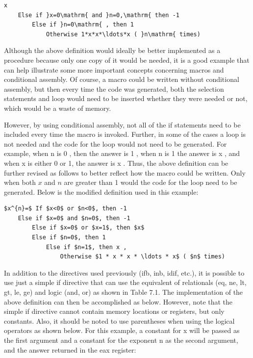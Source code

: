 \documentclass[10pt]{book}
\begin{document}
\begin{center}
\begin{center}
\begin{verbatim}
x
    Else if }x=0\mathrm{ and }n=0,\mathrm{ then -1
        Else if }n=0\mathrm{ , then 1
            Otherwise 1*x*x*\ldots*x ( }n\mathrm{ times)
\end{verbatim}

Although the above definition would ideally be better implemented as a procedure because only one copy of it would be needed, it is a good example that can help illustrate some more important concepts concerning macros and conditional assembly. Of course, a macro could be written without conditional assembly, but then every time the code was generated, both the selection statements and loop would need to be inserted whether they were needed or not, which would be a waste of memory.

However, by using conditional assembly, not all of the if statements need to be included every time the macro is invoked. Further, in some of the cases a loop is not needed and the code for the loop would not need to be generated. For example, when n is 0 , then the answer is 1 , when n is 1 the answer is x , and when x is either 0 or 1, the answer is x . Thus, the above definition can be further revised as follows to better reflect how the macro could be written. Only when both $x$ and $n$ are greater than 1 would the code for the loop need to be generated. Below is the modified definition used in this example:

\begin{verbatim}
$x^{n}=$ If $x<0$ or $n<0$, then -1
    Else if $x=0$ and $n=0$, then -1
        Else if $x=0$ or $x=1$, then $x$
        Else if $n=0$, then 1
            Else if $n=1$, then x ,
                Otherwise $1 * x * x * \ldots * x$ ( $n$ times)
\end{verbatim}

In addition to the directives used previously (ifb, inb, idif, etc.), it is possible to use just a simple if directive that can use the equivalent of relationals (eq, ne, lt, gt, le, ge) and logic (and, or) as shown in Table 7.1. The implementation of the above definition can then be accomplished as below. However, note that the simple if directive cannot contain memory locations or registers, but only constants. Also, it should be noted to use parentheses when using the logical operators as shown below. For this example, a constant for x will be passed as the first argument and a constant for the exponent n as the second argument, and the answer returned in the eax register:


\end{center}
\end{center}
\end{document}
